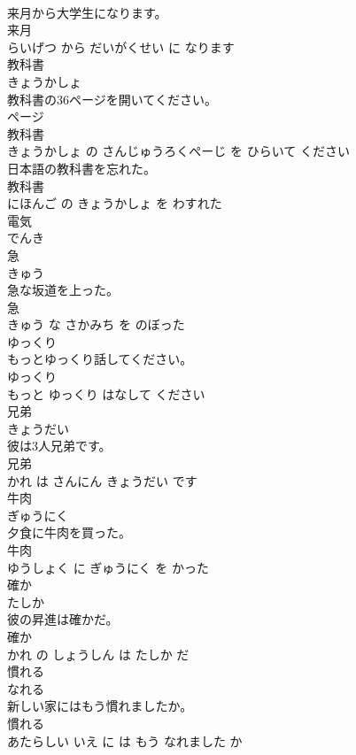 \documentclass[8pt]{extreport}
\begin{document}
\begin{CJK}{UTF8}{min}
\\	来月から大学生になります。	
\\	来月 
\\	らいげつ から だいがくせい に なります			
\\	教科書	
\\	きょうかしょ			
\\	教科書の36ページを開いてください。	
\\	ページ 
\\	教科書 
\\	きょうかしょ の さんじゅうろくぺーじ を ひらいて ください			
\\	日本語の教科書を忘れた。	
\\	教科書 
\\	にほんご の きょうかしょ を わすれた			
\\	電気	
\\	でんき			
\\	急	
\\	きゅう			
\\	急な坂道を上った。	
\\	急 
\\	きゅう な さかみち を のぼった			
\\	ゆっくり	
\\	もっとゆっくり話してください。	
\\	ゆっくり 
\\	もっと ゆっくり はなして ください			
\\	兄弟	
\\	きょうだい			
\\	彼は3人兄弟です。	
\\	兄弟 
\\	かれ は さんにん きょうだい です			
\\	牛肉	
\\	ぎゅうにく			
\\	夕食に牛肉を買った。	
\\	牛肉 
\\	ゆうしょく に ぎゅうにく を かった			
\\	確か	
\\	たしか			
\\	彼の昇進は確かだ。	
\\	確か 
\\	かれ の しょうしん は たしか だ			
\\	慣れる	
\\	なれる			
\\	新しい家にはもう慣れましたか。	
\\	慣れる 
\\	あたらしい いえ に は もう なれました か			

\end{CJK}
\end{document}
